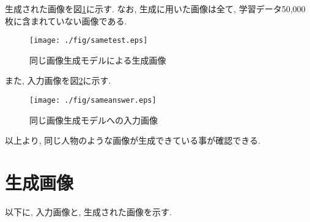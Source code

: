 生成された画像を図\ref{fig:sametest}に示す. なお, 生成に用いた画像は全て, 学習データ50,000枚に含まれていない画像である. 
\begin{figure}[H]
 	\begin{center}
 		\texttt{[image: ./fig/sametest.eps]}
 		\caption{同じ画像生成モデルによる生成画像}
 		\label{fig:sametest}
 	\end{center}
 \end{figure}

また, 入力画像を図\ref{fig:sameanswer}に示す.
\begin{figure}[H]
 	\begin{center}
 		\texttt{[image: ./fig/sameanswer.eps]}
 		\caption{同じ画像生成モデルへの入力画像}
 		\label{fig:sameanswer}
 	\end{center}
 \end{figure}

以上より, 同じ人物のような画像が生成できている事が確認できる. 

\section{生成画像}
以下に, 入力画像と, 生成された画像を示す. 
